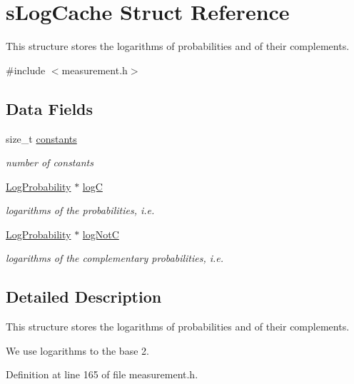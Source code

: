 \hypertarget{structsLogCache}{\section{s\-Log\-Cache \-Struct \-Reference}
\label{structsLogCache}
}


\-This structure stores the logarithms of probabilities and of their complements.  




{\ttfamily \#include $<$measurement.\-h$>$}

\subsection*{\-Data \-Fields}
\begin{DoxyCompactItemize}
\item 
size\-\_\-t \hyperlink{structsLogCache_a06855ad644ec7343d2952cb079d83cd1}{constants}
\begin{DoxyCompactList}\small\item\em number of constants \end{DoxyCompactList}\item 
\hyperlink{common_2measurement_8h_a0a02860cc83aa9ce63d00855bc9058e0}{\-Log\-Probability} $\ast$ \hyperlink{structsLogCache_ac1a2fe56f678e4b2be3b56f9b6c04163}{log\-C}
\begin{DoxyCompactList}\small\item\em logarithms of the probabilities, i.\-e. \end{DoxyCompactList}\item 
\hyperlink{common_2measurement_8h_a0a02860cc83aa9ce63d00855bc9058e0}{\-Log\-Probability} $\ast$ \hyperlink{structsLogCache_aa9bfdee3aa5ff16f6ef8e3bef6da8f9c}{log\-Not\-C}
\begin{DoxyCompactList}\small\item\em logarithms of the complementary probabilities, i.\-e. \end{DoxyCompactList}\end{DoxyCompactItemize}


\subsection{\-Detailed \-Description}
\-This structure stores the logarithms of probabilities and of their complements. 

\-We use logarithms to the base 2. 

\-Definition at line 165 of file measurement.\-h.




